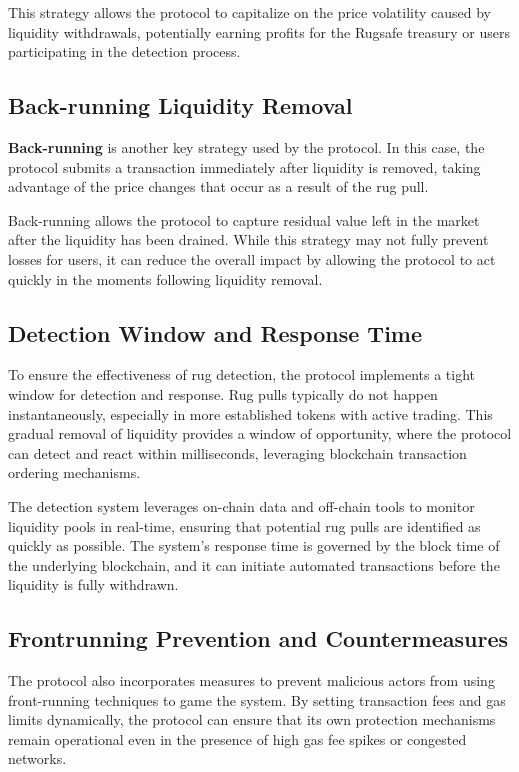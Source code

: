 \documentclass{article}
\begin{document}
This strategy allows the protocol to capitalize on the price volatility caused by liquidity withdrawals, potentially earning profits for the Rugsafe treasury or users participating in the detection process.

\subsection{Back-running Liquidity Removal}

\textbf{Back-running} is another key strategy used by the protocol. In this case, the protocol submits a transaction immediately after liquidity is removed, taking advantage of the price changes that occur as a result of the rug pull. 

Back-running allows the protocol to capture residual value left in the market after the liquidity has been drained. While this strategy may not fully prevent losses for users, it can reduce the overall impact by allowing the protocol to act quickly in the moments following liquidity removal.

\subsection{Detection Window and Response Time}

To ensure the effectiveness of rug detection, the protocol implements a tight window for detection and response. Rug pulls typically do not happen instantaneously, especially in more established tokens with active trading. This gradual removal of liquidity provides a window of opportunity, where the protocol can detect and react within milliseconds, leveraging blockchain transaction ordering mechanisms.

The detection system leverages on-chain data and off-chain tools to monitor liquidity pools in real-time, ensuring that potential rug pulls are identified as quickly as possible. The system’s response time is governed by the block time of the underlying blockchain, and it can initiate automated transactions before the liquidity is fully withdrawn.

\subsection{Frontrunning Prevention and Countermeasures}

The protocol also incorporates measures to prevent malicious actors from using front-running techniques to game the system. By setting transaction fees and gas limits dynamically, the protocol can ensure that its own protection mechanisms remain operational even in the presence of high gas fee spikes or congested networks.
\end{document}
